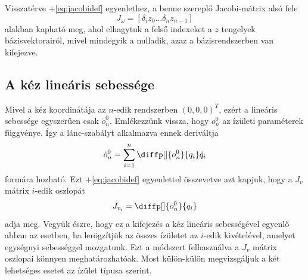 \documentclass[12pt,a4paper]{report}
\theoremstyle{remark}
\theoremstyle{definition}
\begin{document}
Visszatérve \az+\eqref{eq:jacobidef} egyenlethez, a benne szereplő Jacobi-mátrix alsó fele
\begin{equation}
J_\omega = [\delta_i z_0 \ldots \delta_n z_{n-1}]
\end{equation}
alakban kapható meg, ahol elhagytuk a felső indexeket a $z$ tengelyek bázisvektorairól, mivel mindegyik a nulladik, 
azaz a bázisrendszerben van kifejezve.

\subsection{A kéz lineáris sebessége}
Mivel a kéz koordinátája az $n$-edik rendszerben $(0, 0, 0)^T$, ezért a lineáris sebessége egyszerűen csak 
$\dot{o}^{0}_{n}$. Emlékezzünk vissza, hogy $o^{0}_{n}$ az ízületi paraméterek függvénye. Így a lánc-szabályt 
alkalmazva ennek deriváltja
\begin{equation}
\dot{o}^{0}_{n} = \sum^{n}_{i=1} \diffp[]{o^{0}_{n}}{q_i} \dot{q}_i
\end{equation}
formára hozható. Ezt \az+\eqref{eq:jacobidef} egyenlettel összevetve azt kapjuk, hogy a $J_v$ mátrix $i$-edik 
oszlopát
\begin{equation}
J_{v_{i}} = \diffp[]{o^{0}_{n}}{q_i}
\end{equation}
adja meg. Vegyük észre, hogy ez a kifejezés a kéz lineáris sebességével egyenlő abban az esetben, ha lerögzítjük az 
összes ízületet az $i$-edik kivételével, amelyet egységnyi sebességgel mozgatunk. Ezt a módszert felhasználva a 
$J_v$ mátrix oszlopai könnyen meghatározhatóak. Most külön-külön megvizsgáljuk a két lehetséges esetet az ízület 
típusa szerint.
\end{document}
